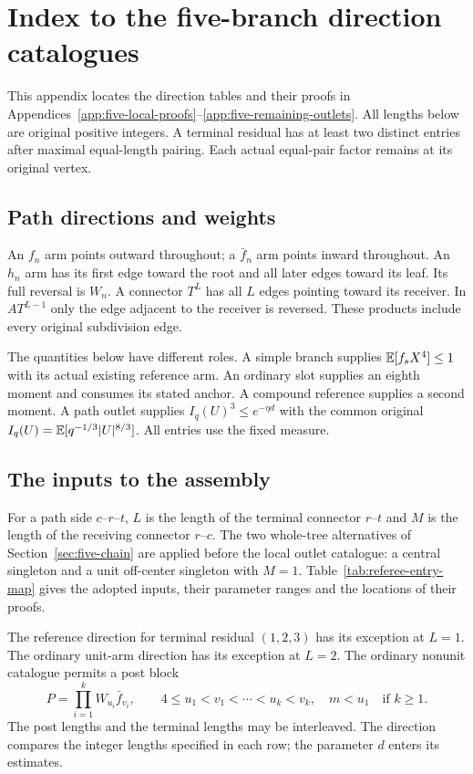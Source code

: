 \section{Index to the five-branch direction catalogues}\label{app:five-directions}
This appendix locates the direction tables and their proofs in
Appendices~\ref{app:five-local-proofs}--\ref{app:five-remaining-outlets}. All lengths below are original positive integers. A
terminal residual has at least two distinct entries after maximal
equal-length pairing. Each actual equal-pair factor remains at its
original vertex.

\subsection{Path directions and weights}
An $f_n$ arm points outward throughout; a $\bar f_n$ arm points inward
throughout. An $h_n$ arm has its first edge toward the root and all
later edges toward its leaf. Its full reversal is $W_n$. A connector
$T^L$ has all $L$ edges pointing toward its receiver. In $AT^{L-1}$
only the edge adjacent to the receiver is reversed. These products
include every original subdivision edge.

The quantities below have different roles. A simple branch supplies
$\mathbb E[f_sX^4]\le1$ with its actual existing reference arm. An ordinary
slot supplies an eighth moment and consumes its stated anchor. A
compound reference supplies a second moment. A path outlet supplies
$I_q(U)^3\le e^{-\eta d}$ with the common original
$I_q(U)=\mathbb E[q^{-1/3}|U|^{8/3}]$. All entries use the fixed measure.

\subsection{The inputs to the assembly}
For a path side $c$--$r$--$t$, $L$ is the length of the terminal
connector $r$--$t$ and $M$ is the length of the receiving connector
$r$--$c$. The two whole-tree alternatives of
Section~\ref{sec:five-chain} are applied before the local outlet
catalogue: a central singleton and a unit off-center singleton with
$M=1$. Table~\ref{tab:referee-entry-map} gives the adopted inputs,
their parameter ranges and the locations of their proofs.



The reference direction for terminal residual $(1,2,3)$ has its
exception at $L=1$. The ordinary unit-arm direction has its exception
at $L=2$. The ordinary nonunit catalogue permits a post block
\[
 P=\prod_{i=1}^{k}W_{u_i}\bar f_{v_i},\qquad
 4\le u_1<v_1<\cdots<u_k<v_k,
 \quad m<u_1\quad\text{if }k\ge1.
\]
The post lengths and the terminal lengths may be interleaved.
The direction compares the integer lengths specified in each row;
the parameter $d$ enters its estimates.

